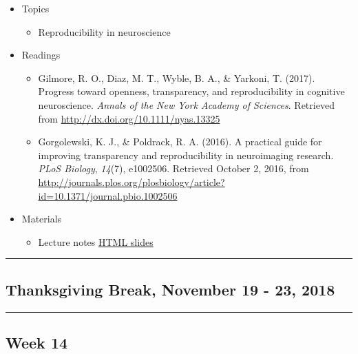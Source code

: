 \documentclass[]{article}
\providecommand{\tightlist}{%
  \setlength{\itemsep}{0pt}\setlength{\parskip}{0pt}}
\begin{document}
\begin{itemize}
\tightlist
\item
  Topics

  \begin{itemize}
  \tightlist
  \item
    Reproducibility in neuroscience
  \end{itemize}
\item
  Readings

  \begin{itemize}
  \tightlist
  \item
    Gilmore, R. O., Diaz, M. T., Wyble, B. A., \& Yarkoni, T. (2017).
    Progress toward openness, transparency, and reproducibility in
    cognitive neuroscience. \emph{Annals of the New York Academy of
    Sciences}. Retrieved from \url{http://dx.doi.org/10.1111/nyas.13325}
  \item
    Gorgolewski, K. J., \& Poldrack, R. A. (2016). A practical guide for
    improving transparency and reproducibility in neuroimaging research.
    \emph{PLoS Biology}, \emph{14}(7), e1002506. Retrieved October 2,
    2016, from
    \url{http://journals.plos.org/plosbiology/article?id=10.1371/journal.pbio.1002506}
  \end{itemize}
\item
  Materials

  \begin{itemize}
  \tightlist
  \item
    Lecture notes \textbar{} \href{}{HTML slides}
  \end{itemize}
\end{itemize}

\begin{center}\rule{0.5\linewidth}{\linethickness}\end{center}

\hypertarget{thanksgiving-break-november-19---23-2018}{%
\subsection{Thanksgiving Break, November 19 - 23,
2018}\label{thanksgiving-break-november-19---23-2018}}

\begin{center}\rule{0.5\linewidth}{\linethickness}\end{center}

\hypertarget{week-14}{%
\subsection{Week 14}\label{week-14}}
\end{document}

